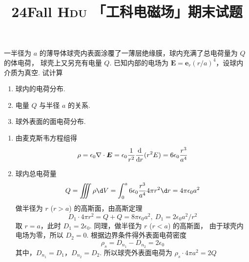 \documentclass[fontset = fandol]{ctexart}
\title{\sffamily\bfseries 24Fall \textsc{Hdu} 「工科电磁场」期末试题}
\author{} \date{}
\begin{document}
\maketitle

\begin{textfig}[ratio = 3:1]
  \begin{problem}[10 pt]
    一半径为 $a$ 的薄导体球壳内表面涂覆了一薄层绝缘膜，球内充满了总电荷量为 $Q$ 的体电荷，
    球壳上又另充有电量 $Q$. 已知内部的电场为 $\bm E = \bm e_r (r/a)^4$，设球内介质为真空.
    试计算
    \begin{enumerate}
      \item 球内的电荷分布.
      \item 电量 $Q$ 与半径 $a$ 的关系.
      \item 球外表面的面电荷分布.
    \end{enumerate}
  \end{problem}
  \textfigsplit\centering
\end{textfig}
\begin{solution}\leavevmode
  \begin{enumerate}
    \item 由麦克斯韦方程组得
    \[
      \rho = \epsilon_0 \nabla \cdot \bm E
    = \epsilon_0 \frac{1}{r^2} \odv{}r(r^2E)
    = 6\epsilon_0\frac{r^3}{a^4}
    \]
    \item 球内总电荷量
    \[
      Q = \iiint \rho \d V
        = \int_0^a 6\epsilon_0\frac{r^3}{a^4} 4\pi r^2 \d r
        = 4\pi\epsilon_0a^2
    \]
    做半径为 $r$ ($r > a$) 的高斯面，由高斯定理
    \[
      D_1 \cdot 4\pi r^2 = Q + Q = 8\pi\epsilon_0a^2,~ D_1 = 2\epsilon_0a^2/r^2
    \]
    取 $r = a$，此时 $D_1 = 2\epsilon_0$. 同理，做半径为 $r$ ($r < a$) 的高斯面，
    由于球壳内电场为零，所以 $D_2 = 0$. 根据边界条件得外表面电荷密度
    \[\rho_s = D_{n_1} - D_{n_2} = 2\epsilon_0\]
    其中，$D_{n_1} = D_1$，$D_{n_2} = D_2$.
    所以球壳外表面电荷为 $\rho_s \cdot 4\pi a^2 = 2Q$
  \end{enumerate}
\end{solution}
\end{document}
